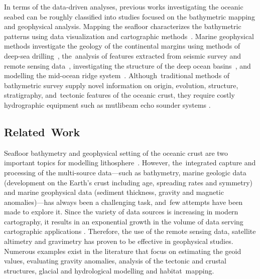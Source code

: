 \documentclass[geomatics,article,accept,pdftex,moreauthors]{Definitions/mdpi}
\begin{document}
In terms of the data-driven analyses, previous works investigating the oceanic seabed can be roughly classified into studies focused on the bathymetric mapping and geophysical analysis. Mapping the seafloor characterizes the bathymetric patterns using data visualization and cartographic methods~\cite{Battista,Lemenkova202105,Lemenkova202012}. Marine geophysical methods investigate the geology of the continental margins using methods of deep-sea drilling~\cite{Schlich1992TheGA,Veevers1991a}, the~analysis of features extracted from seismic survey and remote sensing data~\cite{NEGI2022229330}, investigating the structure of the deep ocean basins~\cite{BENARD2010633,RAMANA2001241,DAVIS201616}, and modelling the mid-ocean ridge \mbox{system~\cite{FREY200073,Sreejith,Lemenkova202112}}. Although~traditional methods of bathymetric survey supply novel information on origin, evolution, structure, stratigraphy, and~tectonic features of the oceanic crust, they require costly hydrographic equipment such as mutlibeam echo sounder systems \cite{Falvey}.

\subsection{Related~Work}

Seafloor bathymetry and geophysical setting of the oceanic crust are two important topics for modelling lithosphere~\cite{WATSON201697}. However, the~integrated capture and processing of the multi-source data---such as bathymetry, marine geologic data (development on the Earth's crust including age, spreading rates and symmetry) and marine geophysical data (sediment thickness, gravity and magnetic anomalies)---has always been a challenging task, and~few attempts have been made to explore it. Since the variety of data sources is increasing in modern cartography, it results in an exponential growth in the volume of data serving cartographic applications \cite{LEE199121}. Therefore, the use of the remote sensing data, satellite altimetry and gravimetry has proven to be effective in geophysical studies. Numerous examples exist in the literature that focus on estimating the geoid values, evaluating gravity anomalies, analysis of the tectonic and crustal structures, glacial and hydrological modelling and habitat~mapping. 
\end{document}
